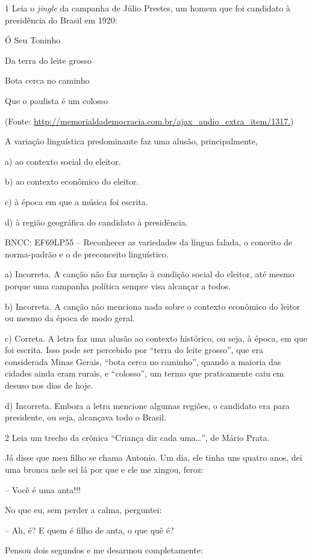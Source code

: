 
\num{1} Leia o \emph{jingle} da campanha de Júlio Prestes, um homem que
foi candidato à presidência do Brasil em 1920:

Ó Seu Toninho

Da terra do leite grosso

Bota cerca no caminho

Que o paulista é um colosso

(Fonte:
\url{http://memorialdademocracia.com.br/ajax_audio_extra_item/1317.})

A variação linguística predominante faz uma alusão, principalmente,

a) ao contexto social do eleitor.

b) ao contexto econômico do eleitor.

c) à época em que a música foi escrita.

d) à região geográfica do candidato à presidência.

BNCC: EF69LP55 -- Reconhecer as variedades da língua falada, o conceito
de norma-padrão e o de preconceito linguístico.

a) Incorreta. A canção não faz menção à condição social do eleitor, até
mesmo porque uma campanha política sempre visa alcançar a todos.

b) Incorreta. A canção não menciona nada sobre o contexto econômico do
leitor ou mesmo da época de modo geral.

c) Correta. A letra faz uma alusão ao contexto histórico, ou seja, à
época, em que foi escrita. Isso pode ser percebido por ``terra do leite
grosso'', que era considerada Minas Gerais, ``bota cerca no caminho'',
quando a maioria das cidades ainda eram rurais, e ``colosso'', um termo
que praticamente caiu em desuso nos dias de hoje.

d) Incorreta. Embora a letra mencione algumas regiões, o candidato era
para presidente, ou seja, alcançava todo o Brasil.

\num{2} Leia um trecho da crônica ``Criança diz cada uma\ldots{}'', de Mário
Prata.

Já disse que meu filho se chama Antonio. Um dia, ele tinha uns quatro
anos, dei uma bronca nele sei lá por que e ele me xingou, feroz:

-- Você é uma anta!!!

No que eu, sem perder a calma, perguntei:

-- Ah, é? E quem é filho de anta, o que quê é?

Pensou dois segundos e me desarmou completamente:

